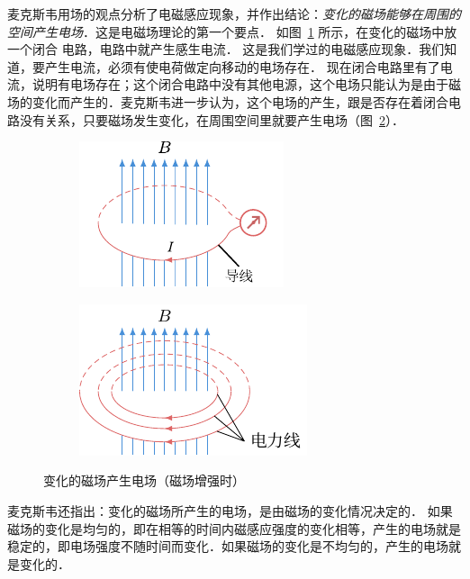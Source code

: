 麦克斯韦用场的观点分析了电磁感应现象，并作出结论：\textit{变化的磁场能够在周围的空间产生电场}．这是电磁场理论的第一个要点．
如图~\ref{fig_C_4-4a} 所示，在变化的磁场中放一个闭合
电路，电路中就产生感生电流．
这是我们学过的电磁感应现象．我们知道，要产生电流，必须有使电荷做定向移动的电场存在．
现在闭合电路里有了电流，说明有电场存在；这个闭合电路中没有其他电源，这个电场只能认为是由于磁场的变化而产生的．麦克斯韦进一步认为，这个电场的产生，跟是否存在着闭合电路没有关系，只要磁场发生变化，在周围空间里就要产生电场（图~\ref{fig_C_4-4b}）．
\begin{figure}[htbp]
    \centering
     \begin{subfigure}{0.43\linewidth}
    	\centering
    	\includegraphics{fig/C/4-4a.pdf}
    	\caption{}\label{fig_C_4-4a}
    \end{subfigure}
    \begin{subfigure}{0.5\linewidth}
    	\centering
    	\includegraphics{fig/C/4-4b.pdf}
    	\caption{}\label{fig_C_4-4b}
    \end{subfigure}
    \caption{变化的磁场产生电场（磁场增强时）}\label{fig_C_4-4}
\end{figure}

麦克斯韦还指出：变化的磁场所产生的电场，是由磁场的变化情况决定的．
如果磁场的变化是均匀的，即在相等的时间内磁感应强度的变化相等，产生的电场就是稳定的，即电场强度不随时间而变化．如果磁场的变化是不均匀的，产生的电场就是变化的．

